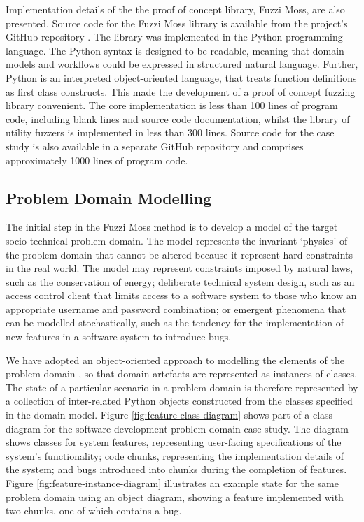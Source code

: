 \documentclass{sig-alternate}
\begin{document}
Implementation details of the the proof of concept library, Fuzzi Moss, are also
presented.  Source code for the Fuzzi Moss library is available from the
project's GitHub repository \citep{wallis2016fuzzi-moss-scm}.  The library was
implemented in the Python programming language.  The Python syntax is designed
to be readable, meaning that domain models and workflows could be expressed in
structured natural language.  Further, Python is an interpreted object-oriented
language, that treats function definitions as first class constructs.  This made
the development of a proof of concept fuzzing library convenient.  The core
implementation is less than 100 lines of program code, including blank lines and
source code documentation, whilst the library of utility fuzzers is implemented
in less than 300 lines. Source code for the case study is also available in a
separate GitHub repository \citep{storer2016softdev-workflow-scm} and comprises
approximately 1000 lines of program code.


\subsection{Problem Domain Modelling}


The initial step in the Fuzzi Moss method is to develop a model of the target
socio-technical problem domain.  The model represents the invariant `physics' of
the problem domain that cannot be altered because it represent hard constraints
in the real world.  The model may represent constraints imposed by
natural laws, such as the conservation of energy; deliberate technical system
design, such as an access control client that limits access to a software system
to those who know an appropriate username and password combination; or emergent
phenomena that can be modelled stochastically, such as the tendency for the
implementation of new features in a software system to introduce bugs.

We have adopted an object-oriented approach to modelling the elements of the
problem domain \citep{bennett06object}, so that domain artefacts are represented
as instances of classes.  The state of a particular scenario in a problem domain
is therefore represented by a collection of inter-related Python objects
constructed from the classes specified in the domain model.  Figure
\ref{fig:feature-class-diagram} shows part of a class diagram for the software
development problem domain case study.  The diagram shows classes for system
features, representing user-facing specifications of the system's functionality;
code chunks, representing the implementation details of the system; and bugs
introduced into chunks during the completion of features.  Figure
\ref{fig:feature-instance-diagram} illustrates an example state for the same
problem domain using an object diagram, showing a feature implemented with two
chunks, one of which contains a bug.
\end{document}
